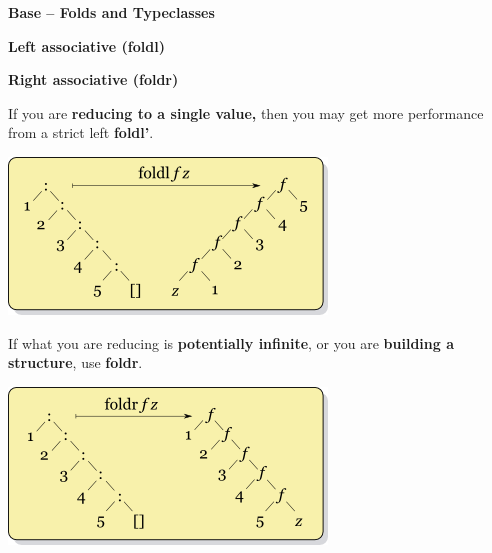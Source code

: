 

\addtolength{\wpXoffset}{5.5cm}
\addtolength{\wpYoffset}{13.1cm}


\usepackage{float}





{\huge \bfseries Base -- Folds and Typeclasses \\[0.2cm]}

\HRule%

\begin{box1}
\begin{multicols}{2}

{\Large \bfseries Left associative (foldl)}

\columnbreak

{\Large \bfseries Right associative (foldr)}

\end{multicols}
\begin{multicols}{4}
\columnbreak

If you are \textbf{reducing to a single value,} then you may get more
performance from a strict left \textbf{foldl'}.

\includegraphics[width=\linewidth,keepaspectratio=true]{images/foldl.png}

\columnbreak

If what you are reducing is \textbf{potentially infinite}, or you are
\textbf{building a structure}, use \textbf{foldr}.

\columnbreak

\includegraphics[width=\linewidth,keepaspectratio=true]{images/foldr.png}


\end{multicols}
\end{box1}
